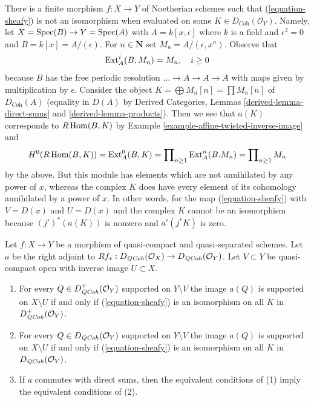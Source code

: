 \begin{example}
\label{example-not-supported-on-inverse-image}
There is a finite morphism $f : X \to Y$ of Noetherian schemes
such that (\ref{equation-sheafy}) is not an isomorphism
when evaluated on some
$K \in D_{\textit{Coh}}(\mathcal{O}_Y)$.
Namely, let $X = \mathop{\mathrm{Spec}}(B) \to Y = \mathop{\mathrm{Spec}}(A)$ with
$A = k[x, \epsilon]$ where $k$ is a field and $\epsilon^2 = 0$ and
$B = k[x] = A/(\epsilon)$. For $n \in \mathbf{N}$ set
$M_n = A/(\epsilon, x^n)$. Observe that
$$
\mathop{\mathrm{Ext}}\nolimits^i_A(B, M_n) = M_n,\quad i \geq 0
$$
because $B$ has the free periodic resolution
$\ldots \to A \to A \to A$ with maps given by multiplication by $\epsilon$.
Consider the object
$K = \bigoplus M_n[n] = \prod M_n[n]$
of $D_{\textit{Coh}}(A)$ (equality in $D(A)$ by
Derived Categories, Lemmas \ref{derived-lemma-direct-sums} and
\ref{derived-lemma-products}). Then we see that $a(K)$ corresponds
to $R\mathop{\mathrm{Hom}}\nolimits(B, K)$ by Example \ref{example-affine-twisted-inverse-image} and
$$
H^0(R\mathop{\mathrm{Hom}}\nolimits(B, K)) = \mathop{\mathrm{Ext}}\nolimits^0_A(B, K) =
\prod\nolimits_{n \geq 1} \mathop{\mathrm{Ext}}\nolimits^n_A(B. M_n) = 
\prod\nolimits_{n \geq 1} M_n
$$
by the above. But this module has elements which are not
annihilated by any power of $x$, whereas the complex $K$
does have every element of its cohomology annihilated by
a power of $x$. In other words, for the map (\ref{equation-sheafy})
with $V = D(x)$ and $U = D(x)$ and the complex $K$ cannot
be an isomorphism because $(j')^*(a(K))$ is nonzero and
$a'(j^*K)$ is zero.
\end{example}

\begin{lemma}
\label{lemma-when-sheafy}
Let $f : X \to Y$ be a morphism of quasi-compact and quasi-separated
schemes. Let $a$ be the right adjoint to
$Rf_* : D_{\mathit{QCoh}}(\mathcal{O}_X) \to D_{\mathit{QCoh}}(\mathcal{O}_Y)$.
Let $V \subset Y$ be quasi-compact open with inverse image $U \subset X$.
\begin{enumerate}
\item For every $Q \in D_{\mathit{QCoh}}^+(\mathcal{O}_Y)$
supported on $Y \setminus V$ the image $a(Q)$ is supported on
$X \setminus U$ if and only if (\ref{equation-sheafy})
is an isomorphism on all $K$ in $D_{\mathit{QCoh}}^+(\mathcal{O}_Y)$.
\item For every $Q \in D_{\mathit{QCoh}}(\mathcal{O}_Y)$
supported on $Y \setminus V$ the image $a(Q)$ is supported on
$X \setminus U$ if and only if (\ref{equation-sheafy})
is an isomorphism on all $K$ in $D_{\mathit{QCoh}}(\mathcal{O}_Y)$.
\item If $a$ commutes with direct sums, then the equivalent conditions of
(1) imply the equivalent conditions of (2).
\end{enumerate}
\end{lemma}

